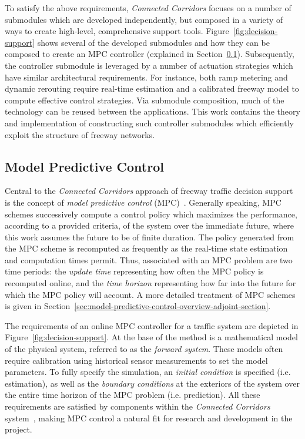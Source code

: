 To satisfy the above requirements, \emph{Connected Corridors} focuses on a number of submodules which are developed independently, but composed in a variety of ways to create high-level, comprehensive support tools. Figure~\ref{fig:decision-support} shows several of the developed submodules and how they can be composed to create an MPC controller (explained in Section~\ref{sec:model-predictive-control}). Subsequently, the controller submodule is leveraged by a number of actuation strategies which have similar architectural requirements. For instance, both ramp metering and dynamic rerouting require real-time estimation and a calibrated freeway model to compute effective control strategies. Via submodule composition, much of the technology can be reused between the applications. This work contains the theory and implementation of constructing such controller submodules which efficiently exploit the structure of freeway networks.

\subsection{Model Predictive Control}
\label{sec:model-predictive-control}

Central to the \emph{Connected Corridors} approach of freeway traffic decision support is the concept of \emph{model predictive control} (MPC)~\cite{Muralidharana,Donoghue2013Splitting,Frejo2011}. Generally speaking, MPC schemes successively compute a control policy which maximizes the performance, according to a provided criteria, of the system over the immediate future, where this work assumes the future to be of finite duration. The policy generated from the MPC scheme is recomputed as frequently as the real-time state estimation and computation times permit. Thus, associated with an MPC problem are two time periods: the \emph{update time} representing how often the MPC policy is recomputed online, and the \emph{time horizon} representing how far into the future for which the MPC policy will account. A more detailed treatment of MPC schemes is given in Section~\ref{sec:model-predictive-control-overview-adjoint-section}.

The requirements of an online MPC controller for a traffic system are depicted in Figure~\ref{fig:decision-support}. At the base of the method is a mathematical model of the physical system, referred to as the \emph{forward system}. These models often require calibration using historical sensor measurements to set the model parameters. To fully specify the simulation, an \emph{initial condition} is specified (i.e. estimation), as well as the \emph{boundary conditions} at the exteriors of the system over the entire time horizon of the MPC problem (i.e. prediction). All these requirements are satisfied by components within the \emph{Connected Corridors} system~\cite{Muralidharan2009b,dervisoglu2014macroscopic,work2010traffic}, making MPC control a natural fit for research and development in the project.

